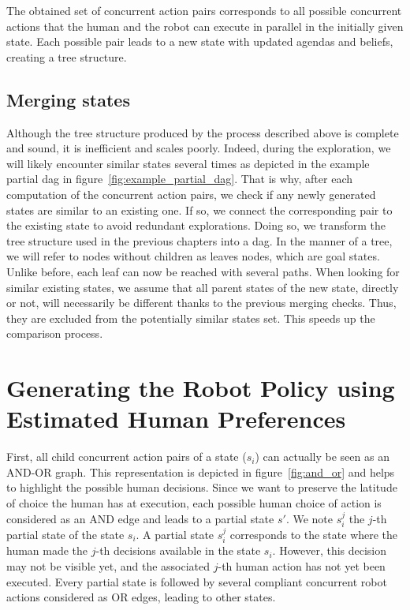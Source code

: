 The obtained set of concurrent action pairs corresponds to all possible concurrent actions that the human and the robot can execute in parallel in the initially given state. Each possible pair leads to a new state with updated agendas and beliefs, creating a tree structure. 

    \subsection*{Merging states}

Although the tree structure produced by the process described above is complete and sound, it is inefficient and scales poorly. Indeed, during the exploration, we will likely encounter similar states several times as depicted in the example partial \acrshort{dag} in figure~\ref{fig:example_partial_dag}. That is why, after each computation of the concurrent action pairs, we check if any newly generated states are similar to an existing one. If so, we connect the corresponding pair to the existing state to avoid redundant explorations. Doing so, we transform the tree structure used in the previous chapters into a \acrfull{dag}. In the manner of a tree, we will refer to nodes without children as leaves nodes, which are goal states. Unlike before, each leaf can now be reached with several paths. 
When looking for similar existing states, we assume that all parent states of the new state, directly or not, will necessarily be different thanks to the previous merging checks. Thus, they are excluded from the potentially similar states set. This speeds up the comparison process. 

\section{Generating the Robot Policy using Estimated Human Preferences}

First, all child concurrent action pairs of a state ($s_i$) can actually be seen as an AND-OR graph. This representation is depicted in figure~\ref{fig:and_or} and helps to highlight the possible human decisions. 
Since we want to preserve the latitude of choice the human has at execution, each possible human choice of action is considered as an AND edge and leads to a partial state $s'$. 
We note $s_i^j$ the $j$-th partial state of the state $s_i$. A partial state $s_i^j$ corresponds to the state where the human made the $j$-th decisions available in the state $s_i$. However, this decision may not be visible yet, and the associated $j$-th human action has not yet been executed.
Every partial state is followed by several compliant concurrent robot actions considered as OR edges, leading to other states.


